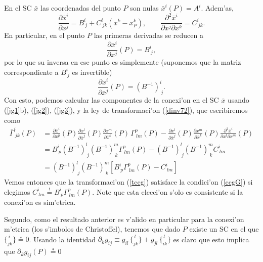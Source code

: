 En el SC $\bar{x}$ las coordenadas del punto $P$ son nulas $\bar{x}^i(P)=A^i$. Adem'as,
\begin{equation}
\frac{\partial\bar{x}^i}{\partial x^j}=B^i_{\ j}+C^i_{\ jk}(x^k-x^k_P), \qquad \frac{\partial^2\bar{x}^i}{\partial x^j\partial x^k}=C^i_{\ jk}. \label{jg1}
\end{equation}
En particular, en el punto $P$ las primeras derivadas se reducen a
\begin{equation}\label{jg2}
\frac{\partial\bar{x}^i}{\partial x^j}(P)=B^i_{\ j},
\end{equation}
por lo que su inversa en ese punto es simplemente (suponemos que la matriz correspondiente a $B^i_{\ j}$ es invertible)
\begin{equation}\label{jg3}
\frac{\partial x^i}{\partial \bar{x}^j}(P)=(B^{-1})^i_{\ j}.
\end{equation}
Con esto, podemos calcular las componentes de la conexi'on en el SC $\bar{x}$ usando (\ref{jg1}b), (\ref{jg2}), (\ref{jg3}), y la ley de transformaci'on (\ref{dinv72}), que escribiremos como
\begin{align}
\bar{\Gamma}_{\ jk}^i(P) &= \frac{\partial\bar{x}^i}{\partial x^p }(P)\frac{\partial
x^l}{\partial\bar{x}^j }(P)\frac{\partial x^m}{\partial\bar{x}^k }(P)\,
\Gamma_{\ lm}^p(P) -\frac{\partial x^l}{\partial \bar{x}^j}(P)\frac{\partial x^m}{\partial \bar{x}^k}(P)\frac{\partial^2\bar{x}^i}{\partial x^l \partial x^m }(P) \\
&= B^i_{\ p}(B^{-1})^l_{\ j}(B^{-1})^m_{\ k}\Gamma^p_{\ lm}(P)-(B^{-1})^l_{\ j}(B^{-1})^m_{\ k}C^i_{\ lm} \\
&= (B^{-1})^l_{\ j}(B^{-1})^m_{\ k}\left[B^i_{\ p}\Gamma^p_{\ lm}(P)-C^i_{\ lm}\right]
\end{align}
Vemos entonces que la transformaci'on (\ref{tccg}) satisface la condici'on (\ref{ccgG}) si elegimos $C^i_{\ lm}\stackrel{!}{=}B^i_{\ p}\Gamma^p_{\ lm}(P)$. Note que esta elecci'on s'olo es consistente si la conexi'on es sim'etrica.

Segundo, como el resultado anterior es v'alido en particular para la conexi'on m'etrica (los s'imbolos de Christoffel), tenemos que dado $P$ existe un SC en el que $\{^{\,i}_{jk}\}\stackrel{*}{=}0$. Usando la identidad $\partial_kg_{ij}\equiv g_{il}\,\{ ^{\, l} _{jk}\}+g_{jl}\,\{ ^{\, l} _{ik}\}$ es claro que esto implica que $\partial_kg_{ij}(P)\stackrel{*}{=}0$

